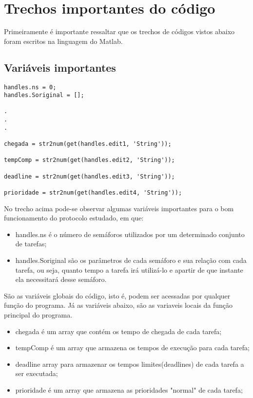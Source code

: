 \section{Trechos importantes do código}

Primeiramente é importante ressaltar que os trechos de códigos vistos abaixo foram escritos na linguagem do Matlab.

\subsection{Variáveis importantes}
\begin{lstlisting}
handles.ns = 0;
handles.Soriginal = [];

.
.
.

chegada = str2num(get(handles.edit1, 'String'));

tempComp = str2num(get(handles.edit2, 'String'));

deadline = str2num(get(handles.edit3, 'String'));

prioridade = str2num(get(handles.edit4, 'String'));

\end{lstlisting}

No trecho acima pode-se observar algumas variáveis importantes para o bom funcionamento do protocolo estudado, em que:


\begin{itemize}
  \item handles.ns é o número de semáforos utilizados por um determinado conjunto de tarefas;
  \item handles.Soriginal são os parâmetros de cada semáforo e sua relação com cada tarefa, ou seja, quanto tempo a tarefa irá utilizá-lo e apartir de que instante ela necessitará desse semáforo.
\end{itemize}

São as variáveis globais do código, isto é, podem ser acessadas por qualquer função do programa.
Já as  variáveis abaixo, são as variaveis locais da função principal do programa.

\begin{itemize}
  \item chegada é um array que contém os tempo de chegada de cada tarefa;
  \item tempComp é um array que armazena os tempos de execução para cada tarefa;
  \item deadline array para armazenar os tempos limites(deadlines) de cada tarefa a ser executada;
  \item prioridade é um array que armazena as prioridades "normal" de cada tarefa;
\end{itemize}

